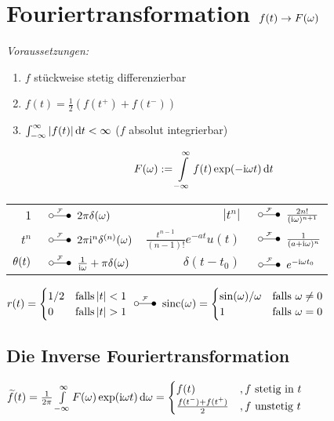 \documentclass[german,color,5pt]{latex4ei/latex4ei_fs}
\begin{document}
\section{Fouriertransformation $f(t) \rightarrow F(\omega)$}
\begin{sectionbox}
	\emph{Voraussetzungen:}
	\begin{enumerate}
		\item $f$ stückweise stetig differenzierbar
		\item $f(t) = \frac{1}{2}\left(f(t^+) + f(t^-)\right)$
		\item $\int_{-\infty}^{\infty}\abs{f(t)} \diff t < \infty$ ($f$ absolut integrierbar)
	\end{enumerate}
	\begin{emphbox}\vspace{-5pt}
		\[F(\omega) := \int\limits_{-\infty}^\infty f(t) \exp(-\i \omega t) \diff t\]
	\end{emphbox}
	\begin{tabular}{rl|rl}
		$1$ & \!\!\!\!\!\!\!\!\!\! $\FT 2\pi \delta(\omega)$ & $|t^n|$ & \!\!\!\!\!\!\!\!\!\! $\FT \frac{2n!}{(\i \omega)^{n+1}}$\\
		$t^n$ & \!\!\!\!\!\!\!\!\!\! $\FT 2\pi \i^n \delta^{(n)}(\omega)$ & $\frac{t^{n-1}}{(n-1)!} e^{-at} u(t)$ & \!\!\!\!\!\!\!\!\!\! $\FT \frac{1}{(a+\i \omega)^n}$\\
		$\operatorname{\theta}(t)$ & \!\!\!\!\!\!\!\!\!\! $\FT \frac{1}{\i \omega} + \pi \delta(\omega)$ & $\delta(t-t_0)$ & \!\!\!\!\!\!\!\!\!\! $\FT e^{-\i \omega t_0}$\\
	\end{tabular}
	$r(t) = \begin{cases}
	1/2 & \text{falls} \abs{t}<1 \\
	0 & \text{falls} \abs{t}>1
	\end{cases}\FT \sinc(\omega) =  \begin{cases}
	\sin(\omega)/\omega & \text{falls } \omega\ne 0 \\
	1 & \text{falls } \omega= 0
	\end{cases}$
	\subsection{Die Inverse Fouriertransformation}
	$\widetilde{f}(t) = \frac{1}{2\pi} \int\limits_{-\infty}^\infty F(\omega) \exp(\i \omega t) \diff \omega = \begin{cases} f(t) &, f \text{ stetig in }t \\ \frac{f(t^-) + f(t^+)}{2} &, f\text{ unstetig }t \end{cases}$
\end{sectionbox}
\end{document}
